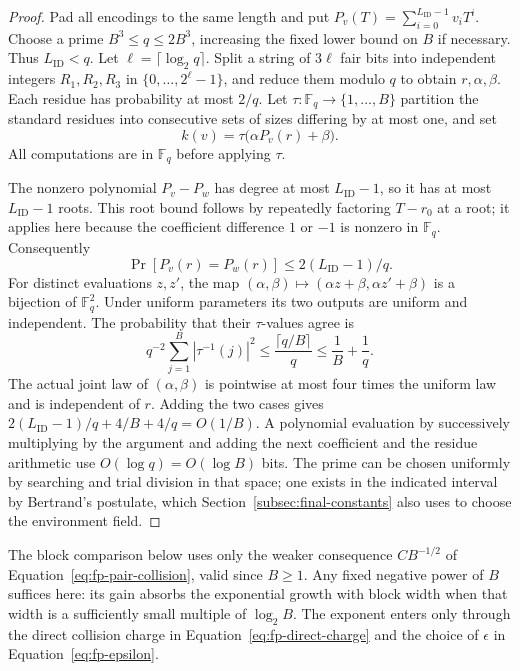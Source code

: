 \begin{proof}
Pad all encodings to the same length and put
$P_v(T)=\sum_{i=0}^{L_{\mathrm{ID}}-1}v_iT^i$.  Choose a prime
$B^3\le q\le2B^3$, increasing the fixed lower bound on $B$ if necessary.
Thus $L_{\mathrm{ID}}<q$.  Let $\ell=\lceil\log_2q\rceil$.  Split a string of $3\ell$
fair bits into independent integers $R_1,R_2,R_3$ in $\{0,\ldots,2^\ell-1\}$,
and reduce them modulo $q$ to obtain $r,\alpha,\beta$.  Each residue has
probability at most $2/q$.  Let
$\tau:\mathbb F_q\longrightarrow\{1,\ldots,B\}$ partition the standard
residues into consecutive sets of sizes differing by at most one, and set
\[
 k(v)=\tau\bigl(\alpha P_v(r)+\beta\bigr).
\]
All computations are in $\mathbb F_q$ before applying $\tau$.

The nonzero polynomial $P_v-P_w$ has degree at most $L_{\mathrm{ID}}-1$, so it has at most
$L_{\mathrm{ID}}-1$ roots.  This root bound follows by repeatedly factoring $T-r_0$ at a
root; it applies here because the coefficient difference $1$ or $-1$ is
nonzero in $\mathbb F_q$.  Consequently
\[
 \Pr[P_v(r)=P_w(r)]\le 2(L_{\mathrm{ID}}-1)/q.
\]
For distinct evaluations $z,z'$, the map
$(\alpha,\beta)\mapsto(\alpha z+\beta,\alpha z'+\beta)$ is a bijection
of $\mathbb F_q^2$.  Under uniform parameters its two outputs are uniform
and independent.  The probability that their $\tau$-values agree is
\[
 q^{-2}\sum_{j=1}^B|\tau^{-1}(j)|^2
 \le \frac{\lceil q/B\rceil}{q}\le\frac1B+\frac1q.
\]
The actual joint law of $(\alpha,\beta)$ is pointwise at most four times
the uniform law and is independent of $r$.  Adding the two cases gives
$2(L_{\mathrm{ID}}-1)/q+4/B+4/q=O(1/B)$.  A polynomial evaluation by successively multiplying by the argument and adding the next coefficient and
the residue arithmetic use $O(\log q)=O(\log B)$ bits.  The prime can be
chosen uniformly by searching and trial division in that space; one
exists in the indicated interval by Bertrand's postulate, which
Section~\ref{subsec:final-constants} also uses to choose the environment
field.
\end{proof}

The block comparison below uses only the weaker consequence
$CB^{-1/2}$ of Equation~\eqref{eq:fp-pair-collision}, valid since
$B\ge1$. Any fixed negative power of $B$ suffices here: its gain absorbs
the exponential growth with block width when that width is a sufficiently
small multiple of $\log_2 B$. The exponent enters only through the direct
collision charge in Equation~\eqref{eq:fp-direct-charge} and the choice
of $\epsilon$ in Equation~\eqref{eq:fp-epsilon}.

